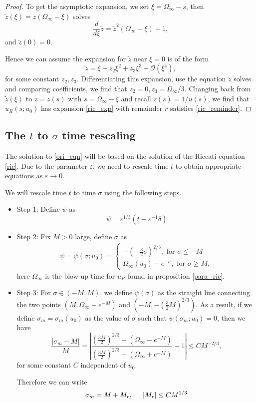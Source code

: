 \documentclass[letterpaper,11pt]{article}
\newcommand{\rmO}{\mathcal{O}}
\newcommand{\eps}{\varepsilon}
\numberwithin{equation}{section}
\theoremstyle{plain}
\begin{document}
\begin{proof}
To get the asymptotic expansion, we set $\xi = \Omega_\infty-s$, then $\tilde{z}(\xi)=z(\Omega_\infty-\xi)$ solves
\[
\frac{d}{d\xi} \tilde{z} = \tilde{z}^2(\Omega_\infty-\xi)+1,
\]
and $\tilde{z}(0) = 0$.

Hence we can assume the expansion for $\tilde{z}$ near $\xi=0$ is of the form
\[
\tilde{z} = \xi + z_2\xi^2+z_3\xi^3 + \rmO(\xi^4),
\]
for some constant $z_2,z_3$. Differentiating this expansion, use the equation $\tilde{z}$ solves and comparing coefficients, we find that $z_2 = 0, z_3 = \Omega_\infty/3$.  Changing back from $\tilde{z}(\xi)$ to $z=z(s)$ with $s = \Omega_\infty-\xi$ and recall $z(s) = 1/u(s)$, we find that $u_R(s;u_0)$ has expansion \eqref{ric_exp} with remainder $r$ satisfies \eqref{ric_reminder}.


\end{proof}
\subsection{The \texorpdfstring{$t$}{t} to \texorpdfstring{$\sigma$}{sigma} time rescaling}\label{t_sigma}

The solution to \eqref{ori_eqn} will be based on the solution of the Riccati equation \eqref{ric}. Due to the parameter $\eps$, we need to rescale time $t$ to obtain appropriate equations as $\eps \to 0$.

We will rescale time $t$ to time $\sigma$ using the following steps.
\begin{itemize}

\item Step 1: Define $\psi$ as
\[
\psi = \eps^{1/3}(t - \eps^{-1}\delta)
\]

\item Step 2:
Fix $M>0$ large, define $\sigma$ as
\begin{align*}
\psi = \psi(\sigma; u_0) =\begin{cases}
-(-\frac{3}{2} \sigma)^{2/3} , \text{ for }\sigma \le -M\\
\Omega_\infty(u_0) -e^{-\sigma}, \text{ for }\sigma \ge M,
\end{cases}
\end{align*}
here $\Omega_\infty$ is the blow-up time for $u_R$ found in proposition \ref{para_ric}.

\item Step 3: For $\sigma \in (-M, M)$, we define $\psi(\sigma)$ as the straight line connecting the two points $(M, \Omega_\infty-e^{-M})$ and $(-M, -(\frac{3}{2}M)^{2/3})$. As a result, if we define $\sigma_m=\sigma_m(u_0)$ as the value of $\sigma$ such that $\psi(\sigma_m; u_0) = 0$, then we have 
\[
\frac{|\sigma_m - M|}{M} = \left| \frac{(\frac{3M}{2})^{2/3}-(\Omega_\infty-e^{-M})}{(\frac{3M}{2})^{2/3}-(\Omega_\infty+e^{-M})} -1 \right|\le CM^{-2/3},
\] 
for some constant $C$ independent of $u_0$.

Therefore we can write
\begin{equation}\label{sigm_asy}
\sigma_m = M + M_r, \hspace{0.2in} |M_r| \le CM^{1/3}
\end{equation}
\end{itemize}
\end{document}
